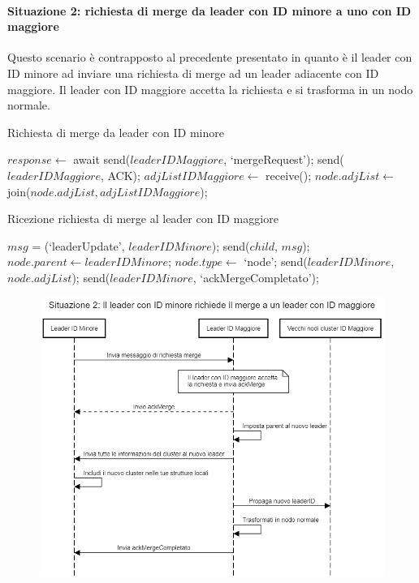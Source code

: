 \documentclass[12pt, a4paper]{report}
\begin{document}
\paragraph{Situazione 2: richiesta di merge da leader con ID minore a uno con ID maggiore}
Questo scenario \`e contrapposto al precedente presentato in quanto \`e il leader con ID minore ad inviare una richiesta di merge ad un leader adiacente con ID maggiore. Il leader con ID maggiore accetta la richiesta e si trasforma in un nodo normale.

\vspace{-5pt}
\begin{algorithm}[H]
\caption{Richiesta di merge da leader con ID minore}
\begin{algorithmic}[1]
    \State $response \gets$ await send($leaderIDMaggiore$, `mergeRequest');
        \State send($leaderIDMaggiore$, ACK);
        \State $adjListIDMaggiore \gets$ receive();
        \State $node.adjList \gets$ join($node.adjList, adjListIDMaggiore$);
    \EndIf
\EndProcedure
\end{algorithmic}
\end{algorithm}

\vspace{-15pt}

\begin{algorithm}[H]
\caption{Ricezione richiesta di merge al leader con ID maggiore}
\begin{algorithmic}[1]
        \State $msg$ = (`leaderUpdate', $leaderIDMinore$);
            \State send($child$, $msg$);
        \EndFor
        \State $node.parent \gets leaderIDMinore$;
        \State $node.type \gets$ `node';
        \State send($leaderIDMinore$, $node.adjList$);
        \State send($leaderIDMinore$, `ackMergeCompletato');
    \EndIf
\EndProcedure
\end{algorithmic}
\end{algorithm}

\vspace{-20pt}
\begin{figure}[H]
    \centering
    \includegraphics[width=0.75\linewidth]{images/Situazione2.png}
\end{figure}
\end{document}
